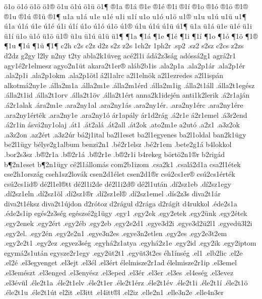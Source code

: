 {ö1o
ö1ó
ö1ö
ö1®
ö1u
ö1ú
ö1ü
ö1¶
®1a
®1á
®1e
®1é
®1i
®1í
®1o
®1ó
®1ö
®1®
®1u
®1ú
®1ü
®1¶
u1a
u1á
u1e
u1é
u1i
u1í
u1o
u1ó
u1ö
u1®
u1u
u1ú
u1ü
u1¶
ú1a
ú1á
ú1e
ú1é
ú1i
ú1í
ú1o
ú1ó
ú1ö
ú1®
ú1u
ú1ú
ú1ü
ú1¶
ü1a
ü1á
ü1e
ü1é
ü1i
ü1í
ü1o
ü1ó
ü1ö
ü1®
ü1u
ü1ú
ü1ü
ü1¶
¶1a
¶1á
¶1e
¶1é
¶1i
¶1í
¶1o
¶1ó
¶1ö
¶1®
¶1u
¶1ú
¶1ü
¶1¶
c2h
c2s
c2z  %
d2z
s2z
z2s
1ch2r
1ph2r
.sp2
.sz2
s2sz
c2cs
z2zs
d2dz
g2gy
l2ly
n2ny
t2ty
abla2k1üveg
acé2l1i
ádá2z3ság
adóssá2g1
agrá2r1
agy1é2r1elmesz
agyo2n1üt
akara2t1er®
aláb2b1is
.ala2p1a
.ala2p1ár
.ala2p1ér
.ala2p1i
.ala2p1okm
.ala2p1ötl
á2l1alrc
a2l1elnök
a2l1ezredes
a2l1ispán
alkotmá2ny1e
.álla2m1a
.álla2m1e
.álla2m1érd
.álla2m1ig
.álla2t1áll
.álla2t1egész
.álla2t1id
.álla2t1orv
.álla2t1öv
.álla2t1ért
anna2k1idején
anti1k2lerik
.á2r1aján
.á2r1alak
.ára2m1e
.ara2ny1al
.ara2ny1ás
.ara2ny1ér.
.ara2ny1érc
.ara2ny1ére
.ara2ny1érték
.ara2ny1e
.ara2ny1ó
ár1apály
ár1d2rág
.á2r1e
á2r1emel
.á3r2end
.á2r1in
ásvá2ny1olaj
.át1
.át2alá
.át2all
.át2ok
.ato2m1e
a2utó
.a2z1
.a3z2ok
.a3z2on
.az2ért
.a3z2úr
bá2j1ital
ba2l1eset
ba2l1egyenes
ba2l1oldal
ban2k1ügy
be2l1ügy
bélye2g1album
benzi2n1
.bé2r1elsz
.bé2r1em
.bete2g1á
b4lokkol
.bor2s3sz
.b®2r1a
.b®2r1á
.b®2r1e
.b®2r1i
b4rekeg
börtö2n1®r
b2rigád
b¶2n1eset
b¶2n1ügy
cé2l1állomás
com2b1izom
.csa2k1
.csalá2d1a
csa2l1étek
cse2h1ország
cseh1sz2lovák
csen2d1élet
csen2d1®r
csú2cs1er®
csú2cs1érték
csú2cs1id®
dé2l1el®tt
dé2l1i2de %
dé2l1i2d® %
dé2l1után
.dí2sz1eb
.dí2sz1egy
.dí2sz1eln
.dí2sz1öl
.dí2sz1®r
.dí2sz1el®
.dí2sz1emel
.dís2z3s
diva2t1ár
diva2t1éksz
diva2t1újdon
d2rótoz
d2rágul
d2rága
d2rágít
d4rukkol
.éde2s1a
.éde2s1ip
egés2z3ség
egészsé2g1ügy
.egy1
.egy2ek
.egy2etek
.egy2ünk
.egy2étek
.egy2enek
.egy2ért
.egy2éb
.egy2eb
.egy2e2d1
.egye3d2i
.egye3d2ü2l1
.egyedü3l2i
.egy2el.
.egy2én
.egy2e2n1
.egye3n2es
.egye3n2etlen
.egy2es
.egy2e3t2em
.egy2e2t1
.egy2ez
.egyez3ség
.egyhá2z1atya
.egyhá2z1e
.egy2id
.egy2ik
.egy2iptom
egymá2s1után
egysze2r1egy
.egy2üt2t1
.együt3t2es
éh1ínség
.el1
.elb2lic
.el2e
.el2é
.el3egyenget
.el3ejt
.el3él
.el3ért
élelmisze2r1ad
élelmisze2r1ip
.el3emel
.el3emészt
.el3enged
.el3enyész
.el3eped
.el3ér
.el3er
.el3es
.el4eség
.el3evez
.el3évül
.éle2t1a
.éle2t1elv
.éle2t1er
.éle2t1érz
.éle2t1év
.éle2t1i
.éle2t1í
.éle2t1ö
.éle2t1u
.éle2t1út
el2it
.el3itt
.el4itt®l
.el2iz
.elle2n1
.elle3n2e
.elle4n3er
}
